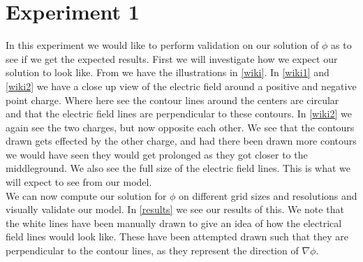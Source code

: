 \section{Experiment 1}
In this experiment we would like to perform validation on our solution of $\phi$ as to see if we get the expected results. First we will investigate how we expect our solution to look like. From \cite{wiki} we have the illustrations in \autoref{wiki}. In \autoref{wiki1} and \autoref{wiki2} we have a close up view of the electric field around a positive and negative point charge. Where here see the contour lines around the centers are circular and that the electric field lines are perpendicular to these contours. In \autoref{wiki2} we again see the two charges, but now opposite each other. We see that the contours drawn gets effected by the other charge, and had there been drawn more contours we would have seen they would get prolonged as they got closer to the middleground. We also see the full size of the electric field lines. This is what we will expect to see from our model.\\
We can now compute our solution for $\phi$ on different grid sizes and resolutions and visually validate our model. In \autoref{results} we see our results of this. We note that the white lines have been manually drawn to give an idea of how the electrical field lines would look like. These have been attempted drawn such that they are perpendicular to the contour lines, as they represent the direction of $\nabla\phi$. 

